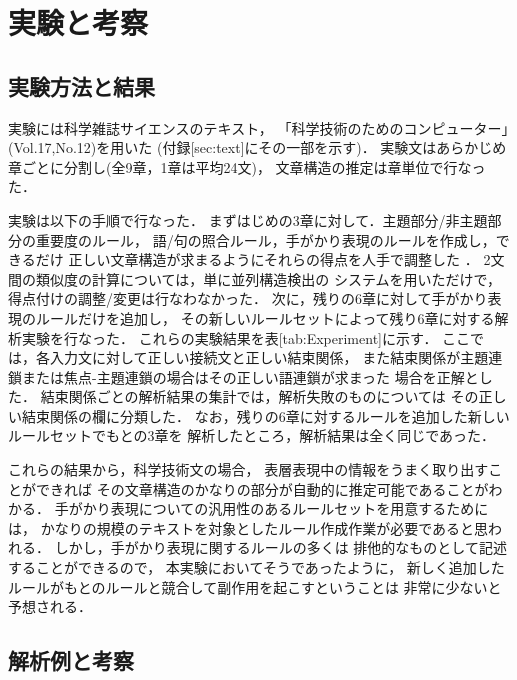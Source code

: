 \section{実験と考察}

\subsection{実験方法と結果}

実験には科学雑誌サイエンスのテキスト，
「科学技術のためのコンピューター」(Vol.17,No.12)を用いた
(付録[sec:text]にその一部を示す)．
実験文はあらかじめ章ごとに分割し(全9章，1章は平均24文)，
文章構造の推定は章単位で行なった．

実験は以下の手順で行なった．
まずはじめの3章に対して．主題部分/非主題部分の重要度のルール，
語/句の照合ルール，手がかり表現のルールを作成し，できるだけ
正しい文章構造が求まるようにそれらの得点を人手で調整した
．
2文間の類似度の計算については，単に並列構造検出の
システムを用いただけで，得点付けの調整/変更は行なわなかった．
次に，残りの6章に対して手がかり表現のルールだけを追加し，
その新しいルールセットによって残り6章に対する解析実験を行なった．
これらの実験結果を表[tab:Experiment]に示す．
ここでは，各入力文に対して正しい接続文と正しい結束関係，
また結束関係が主題連鎖または焦点-主題連鎖の場合はその正しい語連鎖が求まった
場合を正解とした．
結束関係ごとの解析結果の集計では，解析失敗のものについては
その正しい結束関係の欄に分類した．
なお，残りの6章に対するルールを追加した新しいルールセットでもとの3章を
解析したところ，解析結果は全く同じであった．


これらの結果から，科学技術文の場合，
表層表現中の情報をうまく取り出すことができれば
その文章構造のかなりの部分が自動的に推定可能であることがわかる．
手がかり表現についての汎用性のあるルールセットを用意するためには，
かなりの規模のテキストを対象としたルール作成作業が必要であると思われる．
しかし，手がかり表現に関するルールの多くは
排他的なものとして記述することができるので，
本実験においてそうであったように，
新しく追加したルールがもとのルールと競合して副作用を起こすということは
非常に少ないと予想される．

\subsection{解析例と考察}

